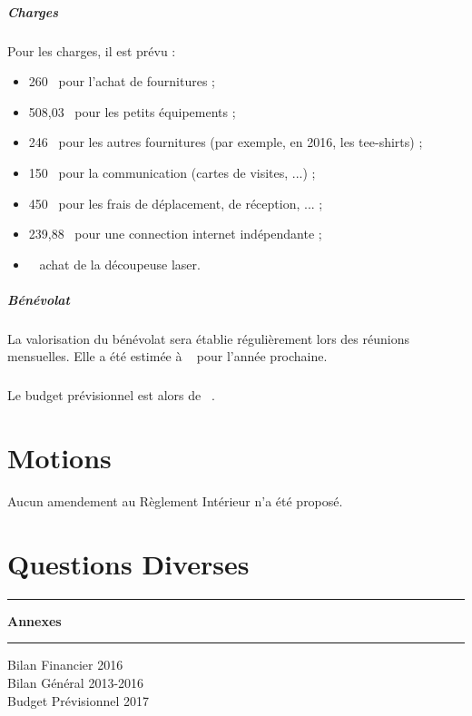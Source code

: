 \documentclass[11pt]{article}
\begin{document}
\subparagraph{Charges}
Pour les charges, il est prévu :
\begin{itemize}
 \item 260~\officialeuro{} pour l'achat de fournitures ;
 \item 508,03~\officialeuro{} pour les petits équipements ;
 \item 246~\officialeuro{} pour les autres fournitures (par exemple, en 2016, les tee-shirts) ;
 \item 150~\officialeuro{} pour la communication (cartes de visites, ...) ;
 \item 450~\officialeuro{} pour les frais de déplacement, de réception, ... ;
 \item 239,88~\officialeuro{} pour une connection internet indépendante ;
 \item {}~\officialeuro{} achat de la découpeuse laser.
\end{itemize}

\subparagraph{Bénévolat}La valorisation du bénévolat sera établie régulièrement lors des réunions mensuelles. 
Elle a été estimée à ~\officialeuro{} pour l'année prochaine.

\subparagraph{}Le budget prévisionnel est alors de ~\officialeuro{}.

\section{Motions}
Aucun amendement au Règlement Intérieur n'a été proposé.

\section{Questions Diverses}

\newpage

\clearpage
\thispagestyle{empty}
\vspace*{\fill}
\begin{center}
\hrule
\vspace{.3cm}
\Huge\bfseries Annexes
\vspace{.3cm}
\hrule
\vspace{2cm}
\Large
\noindent Bilan Financier 2016\\
Bilan Général 2013-2016\\
Budget Prévisionnel 2017
\end{center}
\vspace*{\fill}




\end{document}
